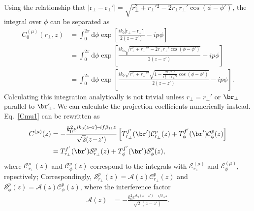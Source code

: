 Using the relationship that $ \left| \mathrm{r}_\perp - \mathrm{r}_\perp'\right|=\sqrt{r_\perp^2+{r_\perp'}\!\!^2 - 2 r_\perp r_\perp'\cos(\phi-\phi')} $, the integral over $ \phi $ can be separated as 
\begin{align}
C^{(\mu)}_0(r_\perp,z) &= \int_0^{2\pi} \!\!\! \mathrm{d}\phi  \exp\!\! \left[ \frac{ik_0 \left| \mathrm{r}_\perp\!\! -\! \mathrm{r}_\perp'\right|}{2(z-z')} \!-\! i p\phi \right]\\
&= \int_0^{2\pi} \!\!\! \mathrm{d}\phi  \exp\!\! \left[ \frac{ik_0 \sqrt{r_\perp^2+{r_\perp'}\!\!^2 - 2 r_\perp r_\perp'\cos(\phi-\phi')} }{2(z-z')} \!-\! i p\phi \right]\\
&= \int_0^{2\pi} \!\!\! \mathrm{d}\phi  \exp\!\! \left[ \frac{ik_0 \sqrt{r_\perp^2 \!+ {r_\perp'}\!\!^2}\sqrt{1 \!-\! \frac{2 r_\perp r_\perp'}{r_\perp^2 \!+ {r_\perp'}\!\!^2}\cos(\phi \!-\! \phi')} }{2(z-z')} \!-\! i p\phi \right].
\end{align}
Calculating this integration analytically is not trivial unless $ r_\perp=r_\perp' $ or $ \br_\perp $ parallel to $ \br_\perp' $. We can calculate the projection coefficients numerically instead. Eq.~\ref{Cmu1} can be rewritten as
\begin{align}
C^{(\mu)} (z) &= - \frac{k_0^2 e^{ik_0(z\!-\!z'\!)\!-\!if\beta_{11} z} }{\sqrt{2}(z\!-\!z')}\left[  T^{f'}_{r_\perp}(\br') \mathcal{C}_{r_\perp}^p (z) +  T^{f'}_\phi(\br') \mathcal{C}_{\phi}^p(z) \right]\\
&= T^{f'}_{r_\perp}(\br') \mathcal{S}_{r_\perp}^p (z) +  T^{f'}_\phi(\br') \mathcal{S}_{\phi}^p(z),
\end{align}
where $ \mathcal{C}_{r_\perp}^p(z) $ and $ \mathcal{C}_\phi^p(z) $ correspond to the integrals with $ \mathcal{E}^{(\mu)}_{r_\perp} $ and $ \mathcal{E}^{(\mu)}_{\phi} $, repectively; Correspondingly, $ \mathcal{S}_{r_\perp}^p(z)=\mathcal{A}(z)\mathcal{C}_{r_\perp}^p(z) $ and $ \mathcal{S}_{\phi}^p(z)=\mathcal{A}(z)\mathcal{C}_\phi^p(z) $, where the interference factor
\begin{align}
\mathcal{A}(z) &= - \frac{k_0^2  e^{ik_0(z\!-\!z'\!)\!-\!if\beta_{11} z}}{\sqrt{2}(z\!-\!z')}.
\end{align} 

